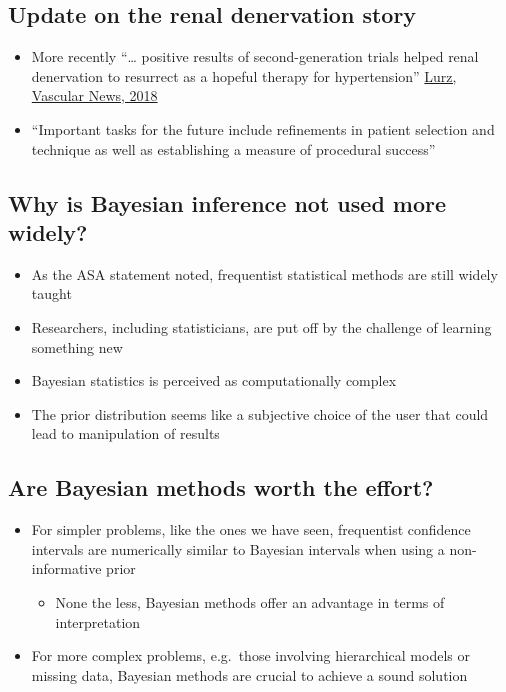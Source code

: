 \documentclass[
]{book}
\providecommand{\tightlist}{%
  \setlength{\itemsep}{0pt}\setlength{\parskip}{0pt}}
\begin{document}
\hypertarget{update-on-the-renal-denervation-story}{%
\subsection{Update on the renal denervation story}\label{update-on-the-renal-denervation-story}}

\begin{itemize}
\tightlist
\item
  More recently ``\ldots{} positive results of second-generation trials helped renal denervation to resurrect as a hopeful therapy for hypertension'' \href{https://vascularnews.com/the-resurgence-of-renal-denervation/}{Lurz, Vascular News, 2018}
\item
  ``Important tasks for the future include refinements in patient selection and technique as well as establishing a measure of procedural success''
\end{itemize}

\hypertarget{why-is-bayesian-inference-not-used-more-widely}{%
\subsection{Why is Bayesian inference not used more widely?}\label{why-is-bayesian-inference-not-used-more-widely}}

\begin{itemize}
\tightlist
\item
  As the ASA statement noted, frequentist statistical methods are still widely taught
\item
  Researchers, including statisticians, are put off by the challenge of learning something new
\item
  Bayesian statistics is perceived as computationally complex
\item
  The prior distribution seems like a subjective choice of the user that could lead to manipulation of results
\end{itemize}

\hypertarget{are-bayesian-methods-worth-the-effort}{%
\subsection{Are Bayesian methods worth the effort?}\label{are-bayesian-methods-worth-the-effort}}

\begin{itemize}
\tightlist
\item
  For simpler problems, like the ones we have seen, frequentist confidence intervals are numerically similar to Bayesian intervals when using a non-informative prior

  \begin{itemize}
  \tightlist
  \item
    None the less, Bayesian methods offer an advantage in terms of interpretation
  \end{itemize}
\item
  For more complex problems, e.g.~those involving hierarchical models or missing data, Bayesian methods are crucial to achieve a sound solution
\end{itemize}
\end{document}
